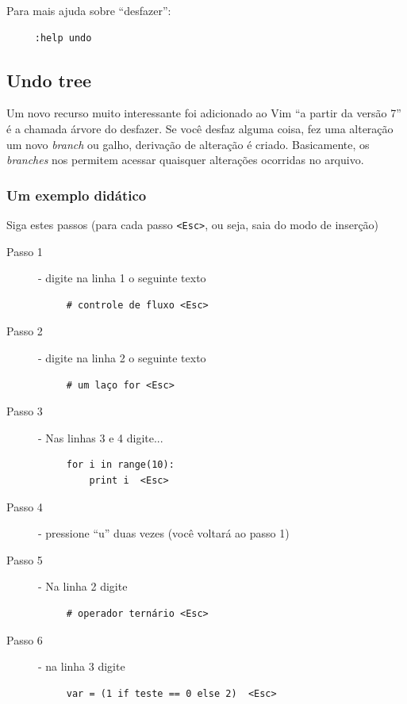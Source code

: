 \documentclass[10pt,a4paper,openany]{book}
\begin{document}
Para mais ajuda sobre ``desfazer'':

\begin{verbatim}
     :help undo
\end{verbatim}

\subsection{Undo tree}
\label{Undo tree}

Um novo recurso muito interessante foi adicionado ao Vim ``a partir da
versão 7''  é a chamada árvore do desfazer.  Se
você desfaz alguma coisa, fez uma alteração um novo {\em branch} ou
galho, derivação de alteração é criado.  Basicamente, os {\em branches}
nos permitem acessar quaisquer alterações ocorridas no arquivo.

\subsubsection{Um exemplo didático}
\label{Um exemplo didático}

Siga estes passos (para cada passo \verb|<Esc>|, ou seja, saia do modo
de inserção)


\begin{description}
\item [Passo 1] - digite na linha 1 o seguinte texto
\begin{verbatim}
     # controle de fluxo <Esc>
\end{verbatim}

\item [Passo 2] - digite na linha 2 o seguinte texto
\begin{verbatim}
     # um laço for <Esc>
\end{verbatim}

\item [Passo 3] - Nas linhas 3 e 4 digite...

\begin{verbatim}
     for i in range(10):
         print i  <Esc>
\end{verbatim}

\item [Passo 4] - pressione ``u'' duas vezes (você voltará ao passo 1)
\item [Passo 5] - Na linha 2 digite

\begin{verbatim}
     # operador ternário <Esc>
\end{verbatim}

\item [Passo 6] - na linha 3 digite

\begin{verbatim}
     var = (1 if teste == 0 else 2)  <Esc>
\end{verbatim}

\end{description}
\end{document}

